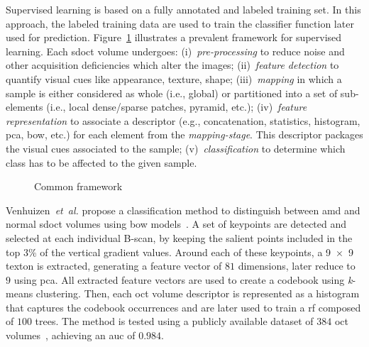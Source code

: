 Supervised learning is based on a fully annotated and labeled training set.
In this approach, the labeled training data are used to train the classifier function later used for prediction.
%
Figure~\ref{fig:ML-scheme} illustrates a prevalent framework for supervised learning.
Each \gls{sdoct} volume undergoes:
(i)~\emph{pre-processing} to reduce noise and other acquisition deficiencies which alter the images;
(ii)~\emph{feature detection} to quantify visual cues like appearance, texture, shape;
(iii)~\emph{mapping} in which a sample is either considered as whole (i.e., global) or partitioned into a set of sub-elements (i.e., local dense/sparse patches, pyramid, etc.);
(iv)~\emph{feature representation} to associate a descriptor (e.g., concatenation, statistics, histogram, \gls{pca}, \gls{bow}, etc.) for each element from the \emph{mapping-stage}.
This descriptor packages the visual cues associated to the sample;
(v)~\emph{classification} to determine which class has to be affected to the given sample.


\begin{figure}
  \caption{Common framework}
  \label{fig:ML-scheme}
\end{figure}

%
Venhuizen~\textit{et~al.} propose a classification method to distinguish between \gls{amd} and normal \gls{sdoct} volumes using \gls{bow} models~\cite{Venhuizen2015}.
%
A set of keypoints are detected and selected at each individual B-scan, by keeping the salient points included in the top $3 \%$ of the vertical gradient values.
Around each of these keypoints, a \SI[product-units=repeat]{9x9}{\px} texton is extracted, generating a feature vector of $81$ dimensions, later reduce to $9$ using \gls{pca}.
All extracted feature vectors are used to create a codebook using \textit{k}-means clustering.
Then, each \gls{oct} volume descriptor is represented as a histogram that captures the codebook occurrences and are later used to train a \gls{rf} composed of $100$ trees.
%
The method is tested using a publicly available dataset of $384$ \gls{oct} volumes~\cite{farsiu2014quantitative}, achieving an \gls{auc} of $0.984$.

